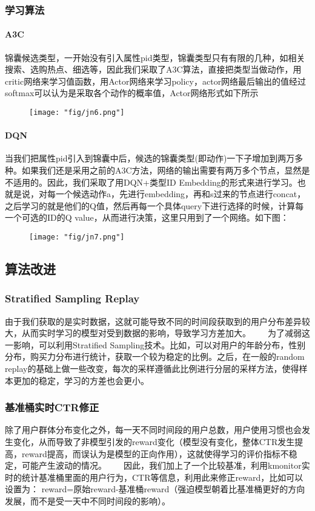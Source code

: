 \subsubsection{学习算法}

\paragraph{A3C}
锦囊候选类型，一开始没有引入属性pid类型，锦囊类型只有有限的几种，如相关搜索、选购热点、细选等，因此我们采取了A3C算法，直接把类型当做动作，用critic网络来学习值函数，用Actor网络来学习policy，actor网络最后输出的值经过softmax可以认为是采取各个动作的概率值，Actor网络形式如下所示

\begin{figure}[!h]
	\centering
	\texttt{[image: "fig/jn6.png"]}
	\caption{}
	\label{fig:jn6}
\end{figure}

 \paragraph{DQN }
 当我们把属性pid引入到锦囊中后，候选的锦囊类型(即动作)一下子增加到两万多种。如果我们还是采用之前的A3C方法，网络的输出需要有两万多个节点，显然是不适用的。因此，我们采取了用DQN+类型ID Embedding的形式来进行学习。也就是说，对每一个候选动作a，先进行embedding，再和s过来的节点进行concat，之后学习的就是他们的Q值，然后再每一个具体query下进行选择的时候，计算每一个可选的ID的Q value，从而进行决策，这里只用到了一个网络。如下图：
\begin{figure}[!h]
	\centering
	\texttt{[image: "fig/jn7.png"]}
	\caption{}
	\label{fig:jn7}
\end{figure}

\subsection{算法改进}
\subsubsection{Stratified Sampling Replay}
由于我们获取的是实时数据，这就可能导致不同的时间段获取到的用户分布差异较大，从而实时学习的模型对受到数据的影响，导致学习方差加大。     为了减弱这一影响，可以利用Stratified Sampling技术。比如，可以对用户的年龄分布，性别分布，购买力分布进行统计，获取一个较为稳定的比例。之后，在一般的random replay的基础上做一些改变，每次的采样遵循此比例进行分层的采样方法，使得样本更加的稳定，学习的方差也会更小。 
\subsubsection{基准桶实时CTR修正}
除了用户群体分布变化之外，每一天不同时间段的用户总数，用户使用习惯也会发生变化，从而导致了非模型引发的reward变化（模型没有变化，整体CTR发生提高，reward提高，而误认为是模型的正向作用），这就使得学习的评价指标不稳定，可能产生波动的情况。     因此，我们加上了一个比较基准，利用kmonitor实时的统计基准桶里面的用户行为，CTR等信息，利用此来修正reward，比如可以设置为： reward=原始reward-基准桶reward（强迫模型朝着比基准桶更好的方向发展，而不是受一天中不同时间段的影响）。 
